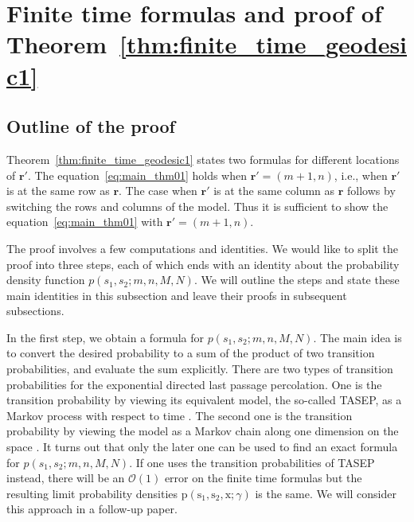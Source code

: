 \documentclass{article}
\numberwithin{equation}{section}
\newcommand{\bigO}{\mathcal{O}}
\begin{document}
\section{Finite time formulas and proof of Theorem~\ref{thm:finite_time_geodesic1}}
\label{sec:proof_thm1}
\subsection{Outline of the proof}


Theorem~\ref{thm:finite_time_geodesic1} states two formulas for different locations of $\mathbf{r}'$. The equation~\eqref{eq:main_thm01} holds when $\mathbf{r}'=(m+1,n)$, i.e., when $\mathbf{r}'$ is at the same row as $\mathbf{r}$. The case when $\mathbf{r}'$ is at the same column as $\mathbf{r}$ follows by switching the rows and columns of the model. Thus it is sufficient to show the equation~\eqref{eq:main_thm01} with $\mathbf{r}'=(m+1,n)$.

The proof involves a few computations and identities. We would like to split the proof into three steps, each of which ends with an identity about the probability density function $p(s_1,s_2;m,n,M,N)$. We will outline the steps and state these main identities in this subsection and leave their proofs in subsequent subsections.


In the first step, we obtain a formula for $p(s_1,s_2;m,n,M,N)$. The main idea is to convert the desired probability to a sum of the product of two transition probabilities, and evaluate the sum explicitly. There are two types of transition probabilities for the exponential directed last passage percolation. One is the transition probability by viewing its equivalent model, the so-called TASEP, as a Markov process with respect to time \cite{Schutz97}. The second one is the transition probability by viewing the model as a Markov chain along one dimension on the space \cite{Johansson10}. It turns out that only the later one can be used to find an exact formula for $p(s_1,s_2;m,n,M,N)$. If one uses the transition probabilities of TASEP instead, there will be an $\bigO(1)$ error on the finite time formulas but the resulting limit probability densities $\mathrm{p}(\mathrm{s}_1,\mathrm{s}_2,\mathrm{x};\gamma)$ is the same. We will consider this approach in a follow-up paper.
\end{document}
